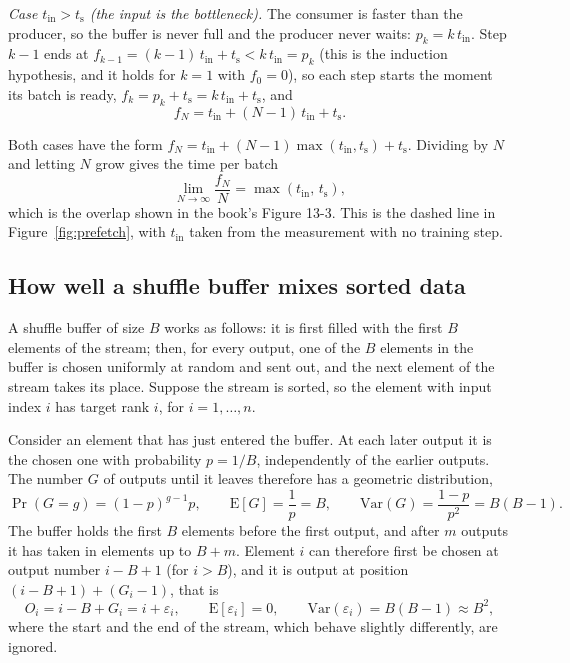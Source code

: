 \emph{Case $t_{\mathrm{in}} > t_{\mathrm{s}}$ (the input is the bottleneck).} The consumer is faster than the producer, so the buffer is never full and the producer never waits: $p_k = k\,t_{\mathrm{in}}$. Step $k-1$ ends at $f_{k-1} = (k-1)\,t_{\mathrm{in}} + t_{\mathrm{s}} < k\,t_{\mathrm{in}} = p_k$ (this is the induction hypothesis, and it holds for $k=1$ with $f_0 = 0$), so each step starts the moment its batch is ready, $f_k = p_k + t_{\mathrm{s}} = k\,t_{\mathrm{in}} + t_{\mathrm{s}}$, and
\begin{equation}
f_N = t_{\mathrm{in}} + (N-1)\,t_{\mathrm{in}} + t_{\mathrm{s}} .
\end{equation}

Both cases have the form $f_N = t_{\mathrm{in}} + (N-1)\max(t_{\mathrm{in}}, t_{\mathrm{s}}) + t_{\mathrm{s}}$. Dividing by $N$ and letting $N$ grow gives the time per batch
\begin{equation}
\lim_{N\to\infty} \frac{f_N}{N} = \max(t_{\mathrm{in}},\, t_{\mathrm{s}}) ,
\end{equation}
which is the overlap shown in the book's Figure 13-3. This is the dashed line in Figure~\ref{fig:prefetch}, with $t_{\mathrm{in}}$ taken from the measurement with no training step.

\subsection{How well a shuffle buffer mixes sorted data}

A shuffle buffer of size $B$ works as follows: it is first filled with the first $B$ elements of the stream; then, for every output, one of the $B$ elements in the buffer is chosen uniformly at random and sent out, and the next element of the stream takes its place. Suppose the stream is sorted, so the element with input index $i$ has target rank $i$, for $i = 1, \dots, n$.

Consider an element that has just entered the buffer. At each later output it is the chosen one with probability $p = 1/B$, independently of the earlier outputs. The number $G$ of outputs until it leaves therefore has a geometric distribution,
\begin{equation}
\Pr(G = g) = (1-p)^{g-1} p, \qquad
\mathrm{E}[G] = \frac{1}{p} = B, \qquad
\mathrm{Var}(G) = \frac{1-p}{p^{2}} = B(B-1) .
\end{equation}
The buffer holds the first $B$ elements before the first output, and after $m$ outputs it has taken in elements up to $B + m$. Element $i$ can therefore first be chosen at output number $i - B + 1$ (for $i > B$), and it is output at position $(i - B + 1) + (G_i - 1)$, that is
\begin{equation}
O_i = i - B + G_i = i + \varepsilon_i , \qquad \mathrm{E}[\varepsilon_i] = 0, \qquad \mathrm{Var}(\varepsilon_i) = B(B-1) \approx B^{2},
\end{equation}
where the start and the end of the stream, which behave slightly differently, are ignored.

